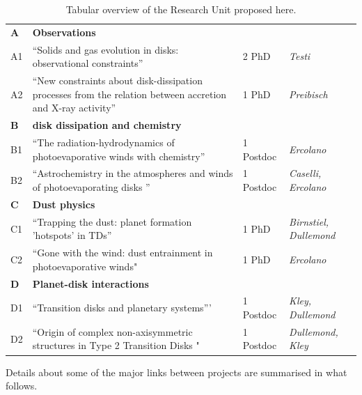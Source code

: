\documentclass[10pt,fleqn,twoside,a4paper]{article}
\newcommand{\AreacolA}{\color{blue}}
\newcommand{\AreacolB}{\color{Green}}
\newcommand{\AreacolC}{\color{YellowOrange}}
\newcommand{\AreacolD}{\color{Red}}
\begin{document}
\begin{table}
\noindent
\begin{tabular}{p{0.7cm}p{8cm}p{2.0cm}p{3.3cm}}
\hline
{\bf\AreacolA A} & {\bf\AreacolA Observations} & & \\ 
A1 & ``Solids and gas evolution in disks: observational constraints'' & 2 PhD & {\em Testi}\\
A2 & ``New constraints about disk-dissipation processes from the relation between accretion and X-ray activity'' & 1 PhD & {\em Preibisch}\\
\hline
{\bf\AreacolB B} & {\bf\AreacolB disk dissipation and chemistry} & & \\ 
B1 & ``The radiation-hydrodynamics of photoevaporative winds with chemistry'' & 1 Postdoc & {\em Ercolano}\\
B2 & ``Astrochemistry in the atmospheres and winds of photoevaporating disks '' & 1 Postdoc & {\em
                                                              Caselli,
                                                              Ercolano}\\
\hline
{\bf\AreacolC C} & {\bf\AreacolC Dust physics} & & \\ 
C1 & ``Trapping the dust: planet formation 'hotspots' in TDs'' & 1 PhD
                               & {\em Birnstiel, Dullemond}\\
C2 & ``Gone with the wind: dust entrainment in photoevaporative winds"& 1 PhD & {\em
                                                              Ercolano}\\
\hline
{\bf\AreacolD D} & {\bf\AreacolD Planet-disk interactions} & & \\ 
D1 & ``Transition disks and planetary systems''' & 1 Postdoc & {\em Kley, Dullemond}\\
D2 & ``Origin of complex non-axisymmetric structures in Type 2
     Transition Disks "& 1 Postdoc & {\em Dullemond, Kley}\\
\hline
\end{tabular}
\caption{\label{table-overview-ru}
Tabular overview of the Research Unit proposed here.}
\end{table}



Details about some of the major links between
projects are summarised in what follows.\\
\end{document}
